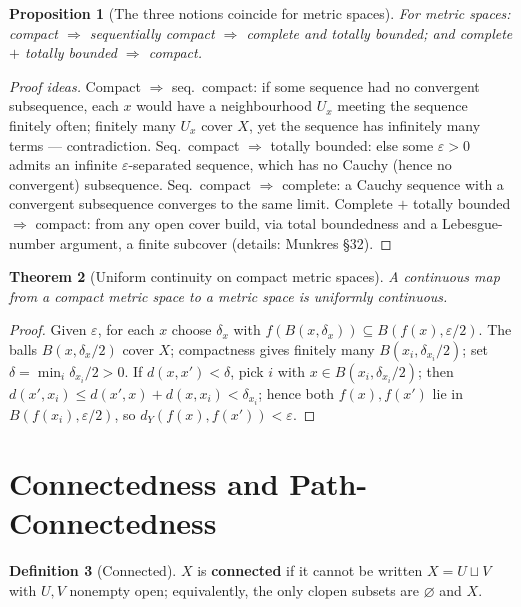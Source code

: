\documentclass[11pt,a4paper]{article}
\newtheorem{theorem}{Theorem}[section]
\newtheorem{proposition}[theorem]{Proposition}
\theoremstyle{definition}
\newtheorem{definition}[theorem]{Definition}
\begin{document}
	\begin{proposition}[The three notions coincide for metric spaces]\label{prop:metric-compact}
		For metric spaces: compact $\Rightarrow$ sequentially compact $\Rightarrow$ complete and totally bounded;
		and complete $+$ totally bounded $\Rightarrow$ compact.
	\end{proposition}
	\begin{proof}[Proof ideas]
		Compact $\Rightarrow$ seq.\ compact: if some sequence had no convergent subsequence, each $x$ would have a
		neighbourhood $U_x$ meeting the sequence finitely often; finitely many $U_x$ cover $X$, yet the sequence
		has infinitely many terms --- contradiction. Seq.\ compact $\Rightarrow$ totally bounded: else some
		$\varepsilon>0$ admits an infinite $\varepsilon$-separated sequence, which has no Cauchy (hence no
		convergent) subsequence. Seq.\ compact $\Rightarrow$ complete: a Cauchy sequence with a convergent
		subsequence converges to the same limit. Complete $+$ totally bounded $\Rightarrow$ compact: from any open
		cover build, via total boundedness and a Lebesgue-number argument, a finite subcover (details: Munkres \S32).
	\end{proof}
	
	\begin{theorem}[Uniform continuity on compact metric spaces]\label{thm:uniform}
		A continuous map from a compact metric space to a metric space is uniformly continuous.
	\end{theorem}
	\begin{proof}
		Given $\varepsilon$, for each $x$ choose $\delta_x$ with $f(B(x,\delta_x))\subseteq B(f(x),\varepsilon/2)$.
		The balls $B(x,\delta_x/2)$ cover $X$; compactness gives finitely many $B(x_i,\delta_{x_i}/2)$; set
		$\delta=\min_i\delta_{x_i}/2>0$. If $d(x,x')<\delta$, pick $i$ with $x\in B(x_i,\delta_{x_i}/2)$; then
		$d(x',x_i)\le d(x',x)+d(x,x_i)<\delta_{x_i}$; hence both $f(x),f(x')$ lie in $B(f(x_i),\varepsilon/2)$,
		so $d_Y(f(x),f(x'))<\varepsilon$.
	\end{proof}
	
	\section{Connectedness and Path-Connectedness}
	
	\begin{definition}[Connected]
		$X$ is \textbf{connected} if it cannot be written $X=U\sqcup V$ with $U,V$ nonempty open; equivalently,
		the only clopen subsets are $\varnothing$ and $X$.
	\end{definition}
	
\end{document}

